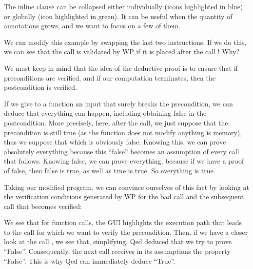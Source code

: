 




The inline  clause can be collapsed either individually
(icons highlighted in blue) or globally (icon highlighted in green). It can be
useful when the quantity of annotations grows, and we want to focus on a few
of them.


We can modify this example by swapping the last two instructions. If we
do this, we can see that the call  is validated by WP if
it is placed after the call ! Why?



We must keep in mind that the idea of the deductive proof is to ensure
that if preconditions are verified, and if our computation terminates,
then the postcondition is verified.



If we give to a function an input that surely breaks the precondition, we can
deduce that everything can happen, including obtaining false in the postcondition.
More precisely, here, after the call, we just suppose that the precondition
is still true (as the function does not modify anything is memory), thus we
suppose that  which is obviously false.
Knowing this, we can prove absolutely everything because this ``false'' becomes
an assumption of every call that follows. Knowing false, we can prove everything,
because if we have a proof of false, then false is true, as well as true is true.
So everything is true.



Taking our modified program, we can convince ourselves of this fact by
looking at the verification conditions generated by WP for the bad call and the
subsequent call that becomes verified:







We see that for function calls, the GUI highlights the execution
path that leads to the call for which we want to verify the precondition.
Then, if we have a closer look at the call , we
see that, simplifying, Qed deduced that we try to prove
``False''. Consequently, the next call  receives in its
assumptions the property ``False''. This is why Qed can immediately
deduce ``True''.



